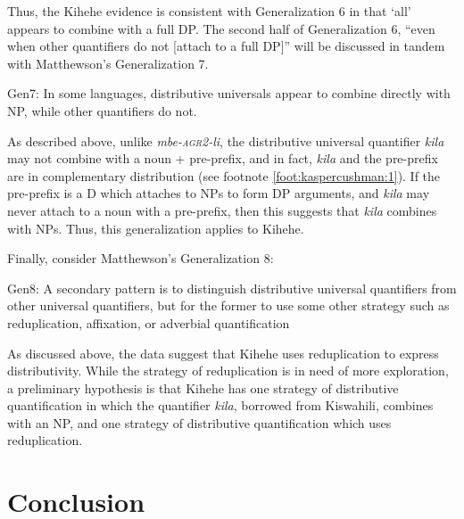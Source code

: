 \documentclass[letterpaper, 12pt]{article}
\begin{document}
Thus, the Kihehe evidence is consistent with Generalization 6 in that `all' appears to combine with a full DP.  The second half of Generalization 6, ``even when other quantifiers do not [attach to a full DP]'' will be discussed in tandem with Matthewson's Generalization 7. 


\begin{exe}
\singlespacing
\ex Gen7: In some languages, distributive universals appear to combine directly with NP, while other quantifiers do not. \cite[p. 36]{matthewson13} \\
\end{exe}

As described above, unlike \textit{mbe-\textsc{agr2}-li}, the distributive universal quantifier \textit{kila} may not combine with a noun + pre-prefix, and in fact, \textit{kila} and the pre-prefix are in complementary distribution (see footnote \ref{foot:kaspercushman:1}). If the pre-prefix is a D which attaches to NPs to form DP arguments, and \textit{kila} may never attach to a noun with a pre-prefix, then this suggests that \textit{kila} combines with NPs. Thus, this generalization applies to Kihehe. 

Finally, consider Matthewson's Generalization 8: 

\begin{exe}
\singlespacing
\ex Gen8: A secondary pattern is to distinguish distributive universal quantifiers from other universal quantifiers, but for the former to use some other strategy such as reduplication, affixation, or adverbial quantification \cite[p. 37]{matthewson13} \\
\end{exe}

As discussed above, the data suggest that Kihehe uses reduplication to express distributivity.  While the strategy of reduplication is in need of more exploration, a preliminary hypothesis is that Kihehe has one strategy of distributive quantification in which the quantifier \textit{kila}, borrowed from Kiswahili, combines with an NP, and one strategy of distributive quantification which uses reduplication. 



\section{Conclusion}
\end{document}
